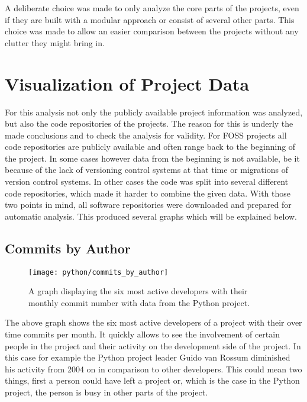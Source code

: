 A deliberate choice was made to only analyze the core parts of the projects,
even if they are built with a modular approach or consist of several other
parts. This choice was made to allow an easier comparison between the projects
without any clutter they might bring in.


\section{Visualization of Project Data} %

For this analysis not only the publicly available project information was
analyzed, but also the code repositories of the projects. The reason for this
is underly the made conclusions and to check the analysis for validity. For
\ac{FOSS} projects all code repositories are publicly available and often range
back to the beginning of the project. In some cases however data from the
beginning is not available, be it because of the lack of versioning control
systems at that time or migrations of version control systems. In other cases
the code was split into several different code repositories, which made it
harder to combine the given data. With those two points in mind, all software
repositories were downloaded and prepared for automatic analysis. This produced
several graphs which will be explained below.

\subsection{Commits by Author} %

\begin{figure}[h!t]
  \centering
  \texttt{[image: python/commits\_by\_author]}
  \caption[The commits by author graph]
  {A graph displaying the six most active developers with their monthly commit
    number with data from the Python project.}
\end{figure}

The above graph shows the six most active developers of a project with their
over time commits per month. It quickly allows to see the involvement of
certain people in the project and their activity on the development side of the
project. In this case for example the Python project leader Guido van Rossum
diminished his activity from 2004 on in comparison to other developers. This
could mean two things, first a person could have left a project or, which is
the case in the Python project, the person is busy in other parts of the
project.

